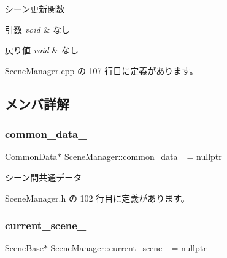 シーン更新関数 


\begin{DoxyParams}{引数}
{\em void} & なし \\
\hline
\end{DoxyParams}

\begin{DoxyRetVals}{戻り値}
{\em void} & なし \\
\hline
\end{DoxyRetVals}


 Scene\+Manager.\+cpp の 107 行目に定義があります。



\subsection{メンバ詳解}
\mbox{\label{class_scene_manager_a5f0f0da3d7f9a8a94f0b5a20c3a4908a}} 
\subsubsection{\texorpdfstring{common\+\_\+data\+\_\+}{common\_data\_}}
{\footnotesize\ttfamily \mbox{\hyperlink{class_scene_manager_1_1_common_data}{Common\+Data}}$\ast$ Scene\+Manager\+::common\+\_\+data\+\_\+ = nullptr\hspace{0.3cm}{\ttfamily [private]}}



シーン間共通データ 



 Scene\+Manager.\+h の 102 行目に定義があります。

\mbox{\label{class_scene_manager_a62dd6d9d807f0a7f2ea4d014126b765e}} 
\subsubsection{\texorpdfstring{current\+\_\+scene\+\_\+}{current\_scene\_}}
{\footnotesize\ttfamily \mbox{\hyperlink{class_scene_base}{Scene\+Base}}$\ast$ Scene\+Manager\+::current\+\_\+scene\+\_\+ = nullptr\hspace{0.3cm}{\ttfamily [private]}}



